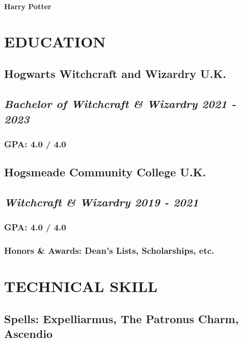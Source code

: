 \documentclass{danwyk_resume}[2022/01/23]
\begin{document}
\begin{spacing}{0.5}

\centering\bf\Huge{Harry Potter}\\
\mdseries\normalsize{}

\section{EDUCATION}
\subsection{\bf Hogwarts Witchcraft and Wizardry \mdseries\hfill U.K.}
\subsection{\itshape\small{Bachelor of Witchcraft \& Wizardry \upshape\hfill 2021 - 2023}}
\subsubsection{GPA: 4.0 / 4.0}
\subsection{\bf Hogsmeade Community College \mdseries\hfill U.K.}
\subsection{\itshape\small{Witchcraft \& Wizardry \upshape\hfill 2019 - 2021}}
\subsubsection{GPA: 4.0 / 4.0}
\subsubsection{Honors \& Awards: Dean's Lists, Scholarships, etc.}

\section{TECHNICAL SKILL}
\subsection{\bf Spells: \mdseries Expelliarmus, The Patronus Charm, Ascendio}

\end{spacing}
\end{document}
